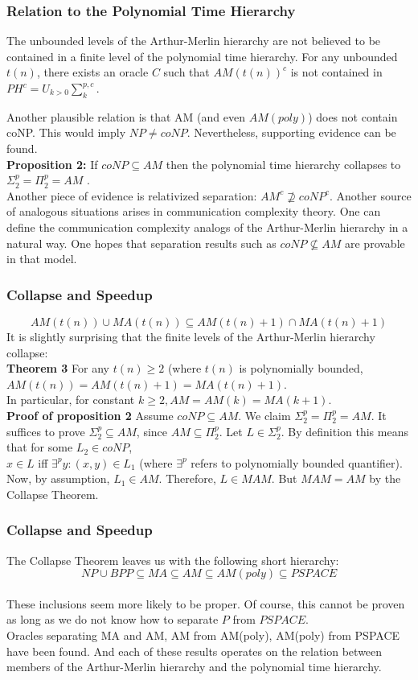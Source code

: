 \documentclass{beamer}
\begin{document}
\begin{frame}
\frametitle{Relation to the Polynomial Time Hierarchy}
The unbounded levels of the Arthur-Merlin hierarchy are not believed to be contained in a finite level of the polynomial time hierarchy. For any unbounded $t(n)$, there exists an oracle $C$ such that $AM(t(n))^c$ is not contained in $PH^c = U_{k>0} \sum_k^{p,c}$.

Another plausible relation is that AM (and even $AM(poly)$) does not contain coNP. This would imply $NP \neq coNP$. Nevertheless, supporting evidence can be found.\\
\textbf{Proposition 2:} If $coNP \subseteq AM$ then the polynomial time hierarchy collapses to $\Sigma_2^p = \Pi_2^p = AM$ .\\
Another piece of evidence is relativized separation:  $AM^c \nsupseteq coNP^c$.
Another source of analogous situations arises in communication complexity theory. One can define the communication complexity analogs of the Arthur-Merlin hierarchy in a natural way. One hopes that separation results such as $coNP \nsubseteq AM$ are provable in that model.
\end{frame}

\begin{frame}
\frametitle{Collapse and Speedup}
$$AM(t(n)) \cup MA(t(n)) \subseteq AM(t(n) + 1) \cap MA(t(n) + 1)$$
It is slightly surprising that the finite levels of the Arthur-Merlin hierarchy collapse:\\
\textbf{Theorem 3}
For any $t(n) \geq 2$ (where $t(n)$ is polynomially bounded, $AM(t(n)) = AM(t(n)+1) = MA(t(n)+1)$.\\
In particular, for constant $k \geq 2, AM = AM(k) = MA(k + 1)$.\\
\textbf{Proof of proposition 2}
Assume $coNP \subseteq AM$. We claim $\Sigma_2^p = \Pi_2^p = AM$. It suffices to prove $\Sigma_2^p \subseteq AM$, since $AM \subseteq \Pi_2^p$.
Let $L \in \Sigma_2^p$. By definition this means that for some $L_2 \in coNP$, \\
$x \in L$ iff $\exists^p y: (x,y) \in L_1$ (where $\exists^p$ refers to polynomially bounded quantifier).\\
Now, by assumption, $L_1 \in AM$. Therefore, $L \in MAM$. But $MAM = AM$ by the Collapse Theorem.
\end{frame}

\begin{frame}
\frametitle{Collapse and Speedup}
The Collapse Theorem leaves us with the following short hierarchy:
$$NP \cup BPP \subseteq MA \subseteq AM \subseteq AM(poly) \subseteq PSPACE$$\\
These inclusions seem more likely to be proper. Of course, this cannot be proven as long as we do not know how to separate $P$ from $PSPACE$.\\
Oracles separating MA and AM, AM from AM(poly), AM(poly) from PSPACE have been found. And each of these results operates on the relation between members of the Arthur-Merlin hierarchy and the polynomial time hierarchy.

\end{frame}
\end{document}
